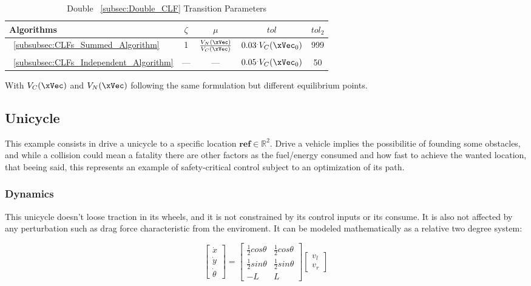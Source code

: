   \bgroup
 \begin{xltabular}{\textwidth}{lcccc}
   \caption{Double ~\ref{subsec:Double_CLF} Transition Parameters}
   \label{tab:Double-CLF:NCDV_parameters}\\
   \toprule
   Algorithms   & $\zeta$  & $\mu$  & $tol$   & $tol_2$            \\
   \midrule
    ~\ref{subsubsec:CLFs_Summed_Algorithm}        & 1         & $\frac{V_N(\xVec)}{V_C(\xVec)}$        & $0.03^.V_C(\xVec_0)$         & 999          \\
    ~\ref{subsubsec:CLFs_Independent_Algorithm}   & ---       & ---                                    & $0.05^.V_C(\xVec_0)$         & 50        \\
    \midrule
   \end{xltabular}
 \egroup

With \(V_C(\xVec)\) and \(V_N(\xVec)\) following the same formulation but different equilibrium points.

\subsection{Unicycle}
\label{subsec:unicycle_simul_setup}

This example consists in drive a unicycle to a specific location \(\mathbf{ref} \in \mathbb{R}^2\). Drive a vehicle implies the possibilitie of founding some obstacles, and while a collision could mean a fatality there are other factors as the fuel/energy consumed and how fast to achieve the wanted location, that beeing said, this represents an example of safety-critical control subject to an optimization of its path. \par

\subsubsection{Dynamics}
\label{subsec:unicycle_dynamics}

This unicycle doesn't loose traction in its wheels, and it is not constrained by its control inputs or its consume. It is also not affected by any perturbation such as drag force characteristic from the enviroment. It can be modeled mathematically as a relative two degree system:

\begin{equation}
    \begin{bmatrix} \dot{x} \\ \dot{y} \\ \dot{\theta} \end{bmatrix} = \begin{bmatrix} \frac{1}{2}cos \theta & \frac{1}{2}cos \theta \\  \frac{1}{2}sin \theta & \frac{1}{2}sin \theta \\ -L & L  \end{bmatrix} \begin{bmatrix} v_l \\ v_r\end{bmatrix}
    \label{eq:unicycle_model}
\end{equation}


